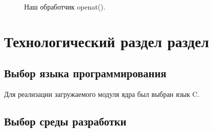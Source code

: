 \documentclass[a4paper,14pt]{article}
\begin{document}
\newpage
\begin{figure}[!h]
    \caption{Наш обработчик openat().}
    \label{fig:openat}
\end{figure}

\newpage
\section{Технологический раздел раздел}

\subsection{Выбор языка программирования}

Для реализации загружаемого модуля ядра был выбран язык C.

\subsection{Выбор среды разработки}
\end{document}
